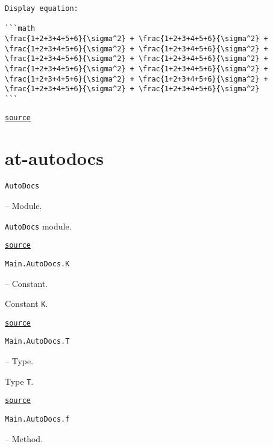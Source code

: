 \begin{adjustwidth}{2em}{0pt}
\begin{verbatim}
Display equation:

```math
\frac{1+2+3+4+5+6}{\sigma^2} + \frac{1+2+3+4+5+6}{\sigma^2} + \frac{1+2+3+4+5+6}{\sigma^2} + \frac{1+2+3+4+5+6}{\sigma^2} + \frac{1+2+3+4+5+6}{\sigma^2} + \frac{1+2+3+4+5+6}{\sigma^2} + \frac{1+2+3+4+5+6}{\sigma^2} + \frac{1+2+3+4+5+6}{\sigma^2} + \frac{1+2+3+4+5+6}{\sigma^2} + \frac{1+2+3+4+5+6}{\sigma^2} + \frac{1+2+3+4+5+6}{\sigma^2} + \frac{1+2+3+4+5+6}{\sigma^2}
```
\end{verbatim}



\href{https://example.org/Repository.jl/blob/test/examples/make.jl#L41-71}{\texttt{source}}


\end{adjustwidth}

\section{at-autodocs}



\label{17848419264812669351}{}

\hypertarget{11302554442225637105}{\texttt{AutoDocs}}  -- {Module.}

\begin{adjustwidth}{2em}{0pt}

\texttt{AutoDocs} module.



\href{https://example.org/Repository.jl/blob/test/examples/make.jl#L75-75}{\texttt{source}}


\end{adjustwidth}
\hypertarget{15441025252371609530}{\texttt{Main.AutoDocs.K}}  -- {Constant.}

\begin{adjustwidth}{2em}{0pt}

Constant \texttt{K}.



\href{https://example.org/Repository.jl/blob/test/examples/make.jl#L88-88}{\texttt{source}}


\end{adjustwidth}
\hypertarget{12338358314596597808}{\texttt{Main.AutoDocs.T}}  -- {Type.}

\begin{adjustwidth}{2em}{0pt}

Type \texttt{T}.



\href{https://example.org/Repository.jl/blob/test/examples/make.jl#L91-91}{\texttt{source}}


\end{adjustwidth}
\hypertarget{14053004641171891989}{\texttt{Main.AutoDocs.f}}  -- {Method.}


